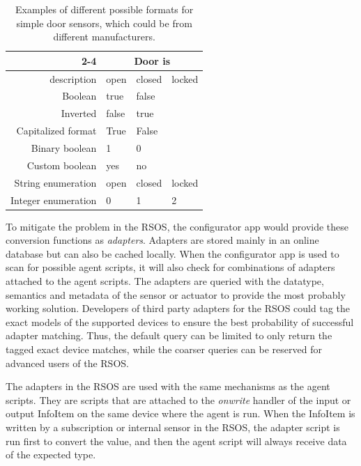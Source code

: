 \bgroup
\def\arraystretch{1.1}
\begin{table}[H]
  \centering
  \caption{Examples of different possible formats for simple door sensors, which could be from different manufacturers.}
  \smallskip
  \begin{tabular}{|r|l|l|l|} \cline{2-4} %
    \multicolumn{1}{r|}{} & \multicolumn{3}{c|}{Door is} \\ \hline %
    description & open & closed & locked \\ \hline \hline
    Boolean & true & false &  \\ \hline
    Inverted & false & true &  \\ \hline
    Capitalized format & True & False &  \\ \hline
    Binary boolean & 1 & 0 &  \\ \hline
    Custom boolean & yes & no & \\ \hline
    String enumeration & open & closed & locked \\ \hline
    Integer enumeration & 0 & 1 & 2 \\ \hline
  \end{tabular}
  \label{table:door_dataformat_example}
\end{table}
\egroup

To mitigate the problem in the RSOS, the configurator app would provide these conversion functions as \emph{adapters}. Adapters are stored mainly in an online database but can also be cached locally. When the configurator app is used to scan for possible agent scripts, it will also check for combinations of adapters attached to the agent scripts. The adapters are queried with the datatype, semantics and metadata of the sensor or actuator to provide the most probably working solution. Developers of third party adapters for the RSOS could tag the exact models of the supported devices to ensure the best probability of successful adapter matching. Thus, the default query can be limited to only return the tagged exact device matches, while the coarser queries can be reserved for advanced users of the RSOS.

The adapters in the RSOS are used with the same mechanisms as the agent scripts. They are scripts that are attached to the \emph{onwrite} handler of the input or output InfoItem on the same device where the agent is run. When the InfoItem is written by a subscription or internal sensor in the RSOS, the adapter script is run first to convert the value, and then the agent script will always receive data of the expected type.

